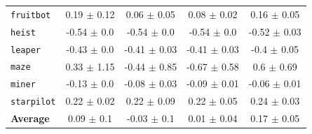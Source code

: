 \begin{table}[h]
\begin{tabular}{@{} l c c c c@{}}
    \texttt{fruitbot}           &                  0.19 $\pm$ 0.12 &                   0.06 $\pm$ 0.05 &                   0.08 $\pm$ 0.02 &             0.16 $\pm$ 0.05 \\
    \texttt{heist}              &                  -0.54 $\pm$ 0.0 &                   -0.54 $\pm$ 0.0 &                   -0.54 $\pm$ 0.0 &            -0.52 $\pm$ 0.03 \\
    \texttt{leaper}             &                  -0.43 $\pm$ 0.0 &                  -0.41 $\pm$ 0.03 &                  -0.41 $\pm$ 0.03 &             -0.4 $\pm$ 0.05 \\
    \texttt{maze}               &                  0.33 $\pm$ 1.15 &                  -0.44 $\pm$ 0.85 &                  -0.67 $\pm$ 0.58 &              0.6 $\pm$ 0.69 \\
    \texttt{miner}             &                  -0.13 $\pm$ 0.0 &                  -0.08 $\pm$ 0.03 &                  -0.09 $\pm$ 0.01 &            -0.06 $\pm$ 0.01 \\
    \texttt{starpilot}         &                  0.22 $\pm$ 0.02 &                   0.22 $\pm$ 0.09 &                   0.22 $\pm$ 0.05 &             0.24 $\pm$ 0.03 \\
    \textbf{Average}                  &                   0.09 $\pm$ 0.1 &                   -0.03 $\pm$ 0.1 &                   0.01 $\pm$ 0.04 &             0.17 $\pm$ 0.05 \\
    \bottomrule
\end{tabular}
\label{tab:procgen-train-eval}
\end{table}

